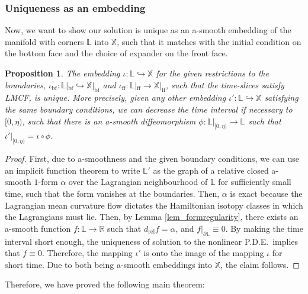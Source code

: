\documentclass[10pt, a4paper]{article}
\theoremstyle{plain}%
\newtheorem{prop}[theorem]{Proposition}
\theoremstyle{definition}
\numberwithin{figure}{section}
\numberwithin{equation}{section}
\newcommand{\bL}{\mathbb{L}}
\newcommand{\bX}{\mathbb{X}}
\newcommand{\bR}{\mathbb{R}}
\newcommand{\pa}{\partial}
\newcommand{\rt}{\rightarrow}
\newcommand{\rel}{\mathrm{rel}}
\newcommand{\ff}{\mathrm{ff}}
\newcommand{\botf}{\textrm{bf}}
\begin{document}
\subsubsection{Uniqueness as an embedding}
Now, we want to show our solution is unique as an a-smooth embedding of the manifold with corners $\bL$ into $\bX$, such that it matches with the initial condition on the bottom face and the choice of expander on the front face.
\begin{prop}
	The embedding $\iota: \bL\hookrightarrow \bX$ for the given restrictions to the boundaries, $\iota_{\botf}:\bL|_{\botf} \hookrightarrow \bX|_{\botf}$ and $\iota_{\ff} : \bL|_{\ff} \rightarrow \bX|_{\ff}$, such that the time-slices satisfy LMCF, is unique. More precisely, given any other embedding $\iota': \bL \hookrightarrow \bX$ satisfying the same boundary conditions, we can decrease the time interval if necessary to $[0,\eta)$, such that there is an a-smooth diffeomorphism $\phi: \bL|_{[0,\eta)} \rightarrow \bL$ such that $\iota'|_{[0,\eta)} = \iota \circ \phi$.
\end{prop}
\begin{proof}
First, due to a-smoothness and the given boundary conditions, we can use an implicit function theorem to write $\bL'$ as the graph of a relative closed a-smooth $1$-form $\alpha$ over the Lagrangian neighbourhood of $\bL$ for sufficiently small time, such that the form vanishes at the boundaries. Then, $\alpha$ is exact because the Lagrangian mean curvature flow dictates the Hamiltonian isotopy classes in which the Lagrangians must lie. Then, by Lemma \ref{lem_formregularity}, there exists an a-smooth function $f:\bL\rt \bR$ such that $d_\rel f =\alpha$, and $f|_{\pa\bL}\equiv 0$. By making the time interval short enough, the uniqueness of solution to the nonlinear P.D.E.\ implies that $f\equiv 0$. Therefore, the mapping $\iota'$ is onto the image of the mapping $\iota$ for short time. Due to both being a-smooth embeddings into $\bX$, the claim follows.
\end{proof}

Therefore, we have proved the following main theorem:
\end{document}
